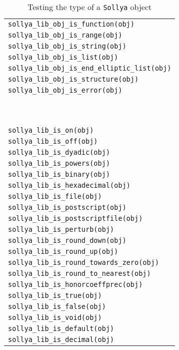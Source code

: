 \documentclass[a4paper]{article}
\newcommand{\sollya}{\texttt{Sollya}\xspace}
\begin{document}
\begin{table}[htp]
  \caption{Testing the type of a \sollya object}
  \label{type_of_an_object}
  \begin{center}
    \begin{tabular}{|l|}
      \hline
      \verb|sollya_lib_obj_is_function(obj)| \\
      \verb|sollya_lib_obj_is_range(obj)| \\
      \verb|sollya_lib_obj_is_string(obj)| \\
      \verb|sollya_lib_obj_is_list(obj)| \\
      \verb|sollya_lib_obj_is_end_elliptic_list(obj)| \\
      \verb|sollya_lib_obj_is_structure(obj)| \\
      \verb|sollya_lib_obj_is_error(obj)| \\
      ~\\
      \hline
      ~\\
      \verb|sollya_lib_is_on(obj)| \\
      \verb|sollya_lib_is_off(obj)| \\
      \verb|sollya_lib_is_dyadic(obj)| \\
      \verb|sollya_lib_is_powers(obj)| \\
      \verb|sollya_lib_is_binary(obj)| \\
      \verb|sollya_lib_is_hexadecimal(obj)| \\
      \verb|sollya_lib_is_file(obj)| \\
      \verb|sollya_lib_is_postscript(obj)| \\
      \verb|sollya_lib_is_postscriptfile(obj)| \\
      \verb|sollya_lib_is_perturb(obj)| \\
      \verb|sollya_lib_is_round_down(obj)| \\
      \verb|sollya_lib_is_round_up(obj)| \\
      \verb|sollya_lib_is_round_towards_zero(obj)| \\
      \verb|sollya_lib_is_round_to_nearest(obj)| \\
      \verb|sollya_lib_is_honorcoeffprec(obj)| \\
      \verb|sollya_lib_is_true(obj)| \\
      \verb|sollya_lib_is_false(obj)| \\
      \verb|sollya_lib_is_void(obj)| \\
      \verb|sollya_lib_is_default(obj)| \\
      \verb|sollya_lib_is_decimal(obj)| \\

\end{tabular}
\end{center}
\end{table}
\end{document}
